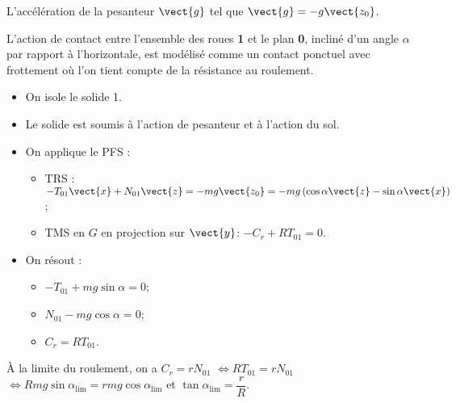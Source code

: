 L'accélération de la pesanteur $\vect{g}$ tel que $\vect{g}=-g\vect{z_0}$. 



L’action de contact entre l’ensemble des roues  \textbf{1} et le plan \textbf{0}, incliné d’un angle $\alpha$ par rapport à l’horizontale, est  modélisé comme un contact ponctuel avec frottement où l’on tient compte de la résistance au roulement. 


\fi

\ifprof
\begin{corrige}
\begin{itemize}
\item On isole le solide 1. 
\item Le solide est soumis à l'action de pesanteur et à l'action du sol. 
\item On applique le PFS :
\begin{itemize}
\item TRS : $-T_{01}\vect{x}+N_{01}\vect{z}=-mg\vect{z_0}=-mg\left( \cos \alpha \vect{z}-\sin\alpha \vect{x} \right)$;
\item TMS en $G$ en projection sur $\vect{y}$: $-C_r+RT_{01}=0$.
\end{itemize}
\item On résout : 
\begin{itemize}
\item $-T_{01} +mg\sin\alpha = 0$;
\item $N_{01} -mg\cos\alpha = 0$;
\item $C_r=RT_{01}$.
\end{itemize}
\end{itemize}
\end{corrige}
\else
\fi


\ifprof
\begin{corrige}
À la limite du roulement, on a $C_r=rN_{01}$ $\Leftrightarrow RT_{01}=rN_{01}$ $\Leftrightarrow Rmg\sin\alpha_{\text{lim}}=rmg\cos\alpha_{\text{lim}}$ et  $\tan \alpha_{\text{lim}} = \dfrac{r}{R}$.
\end{corrige}
\else
\fi

